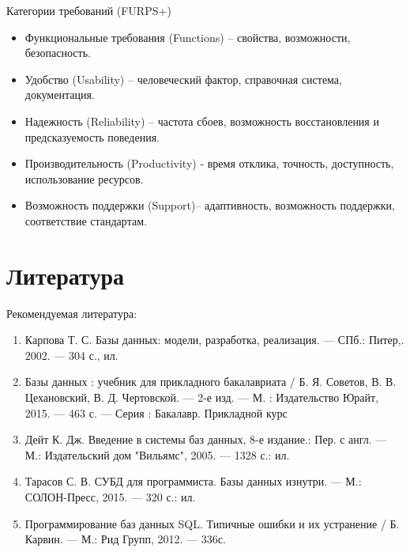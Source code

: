 \documentclass{beamer}
\begin{document}
\begin{frame}
\begin{block}{Категории требований (FURPS+)}
\begin{itemize}
\item Функциональные требования (Functions) – свойства, возможности, безопасность.
\item Удобство (Usability) – человеческий фактор, справочная система, документация.
\item Надежность (Reliability) – частота сбоев, возможность восстановления и предсказуемость поведения.
\item Производительность (Productivity) - время отклика, точность, доступность, использование ресурсов.
\item Возможность поддержки (Support)– адаптивность, возможность поддержки, соответствие стандартам.
\end{itemize}
\end{block}
\end{frame}
  
\section*{Литература}
\begin{frame}   
Рекомендуемая литература:
\begin{enumerate}
\item Карпова Т. С. Базы данных: модели, разработка, реализация. — СПб.: Питер,. 2002. — 304 с., ил.
\item Базы данных : учебник для прикладного бакалавриата / Б. Я. Советов, В. В. Цехановский, В. Д. Чертовской. — 2-е изд. — М. : Издательство Юрайт, 2015. — 463 с. — Серия : Бакалавр. Прикладной курс
\item Дейт К. Дж. Введение в системы баз данных, 8-е издание.: Пер. с англ. — М.: Издательский дом "Вильямс", 2005. — 1328 с.: ил.
\item Тарасов С. В. СУБД для программиста. Базы данных изнутри. — М.: СОЛОН-Пресс, 2015. — 320 с.: ил.
\item Программирование  баз  данных  SQL.  Типичные  ошибки  и  их устранение  /  Б.  Карвин.  —  М.:  Рид  Групп,  2012.  — 336с. 
\end{enumerate}
\end{frame}   
\end{document}
